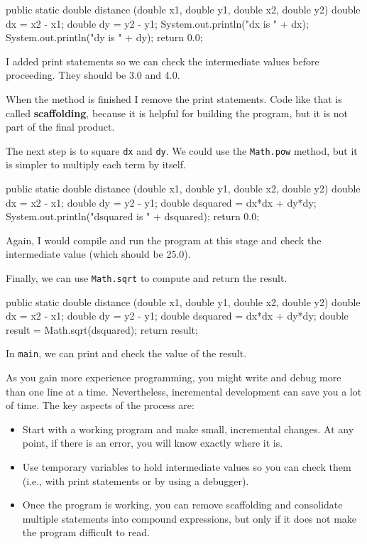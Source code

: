 \documentclass[12pt]{book}
\begin{document}
\begin{code}
    public static double distance
            (double x1, double y1, double x2, double y2) {
        double dx = x2 - x1;
        double dy = y2 - y1;
        System.out.println("dx is " + dx);
        System.out.println("dy is " + dy);
        return 0.0;
    }
\end{code}

I added print statements so we can check the intermediate values before proceeding.
They should be 3.0 and 4.0.


When the method is finished I remove the print statements.
Code like that is called {\bf scaffolding}, because it is helpful for building the program, but it is not part of the final product.

The next step is to square {\tt dx} and {\tt dy}.
We could use the {\tt Math.pow} method, but it is simpler to multiply each term by itself.

\begin{code}
    public static double distance
            (double x1, double y1, double x2, double y2) {
        double dx = x2 - x1;
        double dy = y2 - y1;
        double dsquared = dx*dx + dy*dy;
        System.out.println("dsquared is " + dsquared);
        return 0.0;
    }
\end{code}

Again, I would compile and run the program at this stage and check the intermediate value (which should be 25.0).

Finally, we can use {\tt Math.sqrt} to compute and return the result.

\begin{code}
    public static double distance
            (double x1, double y1, double x2, double y2) {
        double dx = x2 - x1;
        double dy = y2 - y1;
        double dsquared = dx*dx + dy*dy;
        double result = Math.sqrt(dsquared);
        return result;
    }
\end{code}

In {\tt main}, we can print and check the value of the result.

As you gain more experience programming, you might write and debug more than one line at a time.
Nevertheless, incremental development can save you a lot of time.
The key aspects of the process are:

\begin{itemize}

\item Start with a working program and make small, incremental changes.
At any point, if there is an error, you will know exactly where it is.

\item Use temporary variables to hold intermediate values so you can check them (i.e., with print statements or by using a debugger).

\item Once the program is working, you can remove scaffolding and consolidate multiple statements into compound expressions, but only if it does not make the program difficult to read.

\end{itemize}
\end{document}
